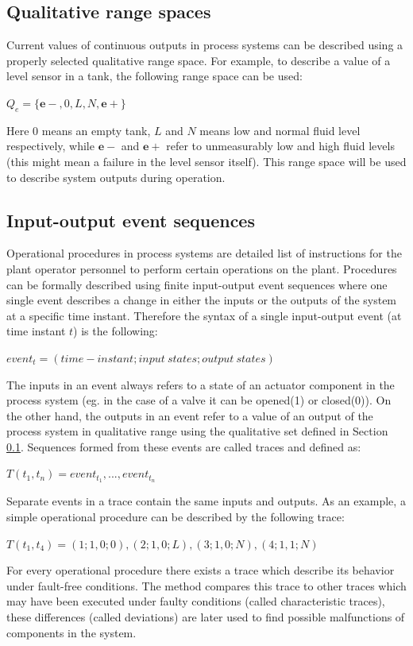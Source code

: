 \documentclass[conference]{IEEEtran}
\begin{document}
\subsection{Qualitative range spaces}
\label{sec:qualrngspc}
Current values of continuous outputs in process systems can be described using a properly selected qualitative range space. For example, to describe a value of a level sensor in a tank, the following range space can be used:

$Q_e=\{\mathbf{e-},0,L,N,\mathbf{e+}\}$

Here $0$ means an empty tank, $L$ and $N$ means low and normal fluid level respectively, while $\mathbf{e-}$ and $\mathbf{e+}$ refer to unmeasurably low and high fluid levels (this might mean a failure in the level sensor itself). This range space will be used to describe system outputs during operation.

\subsection{Input-output event sequences}
\label{sec:ioseq}

Operational procedures in process systems are detailed list of instructions for the plant operator personnel to perform certain operations on the plant. Procedures can be formally described using finite input-output event sequences where one single event describes a change in either the inputs or the outputs of the system at a specific time instant. Therefore the syntax of a single input-output event (at time instant $t$) is the following:

$event_t=(time-instant;{input~states};{output~states})$

The inputs in an event always refers to a state of an actuator component in the process system (eg. in the case of a valve it can be opened(1) or closed(0)). On the other hand, the outputs in an event refer to a value of an output of the process system in qualitative range using the qualitative set defined in Section \ref{sec:qualrngspc}. Sequences formed from these events are called traces and defined as:

$T(t_1,t_n)={event_{t_1},...,event_{t_n}}$

Separate events in a trace contain the same inputs and outputs. As an example, a simple operational procedure can be described by the following trace:

$T(t_1,t_4)=(1;1,0;0),(2;1,0;L),(3;1,0;N),(4;1,1;N)$

For every operational procedure there exists a trace which describe its behavior under fault-free conditions. The method compares this trace to other traces which may have been executed under faulty conditions (called characteristic traces), these differences (called deviations) are later used to find possible malfunctions of components in the system.
\end{document}
